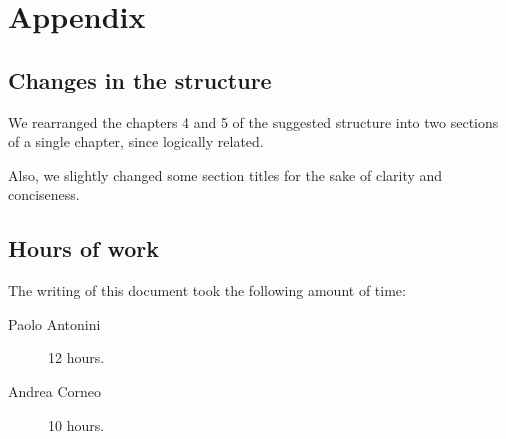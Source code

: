 \chapter{Appendix}\label{chap:appendix}

\section*{Changes in the structure}
We rearranged the chapters 4 and 5 of the suggested structure into two sections of a single chapter, since logically related.

Also, we slightly changed some section titles for the sake of clarity and conciseness.

\section*{Hours of work}
The writing of this document took the following amount of time:

\begin{description}
	\item [Paolo Antonini] 12 hours.
	\item [Andrea Corneo] 10 hours.
\end{description}



